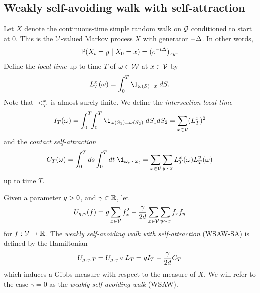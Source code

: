 
\subsection{Weakly self-avoiding walk with self-attraction}

Let $X$ denote the continuous-time simple random walk on $\mathcal{G}$ conditioned
to start at $0$. This is the $\mathcal{V}$-valued Markov process $X$ with generator
$-\Delta$. In other words,
\begin{equation}
\operatorname{\mathbb{P}}(X_t = y \mid X_0 = x) = (e^{-t \Delta})_{xy}.
\end{equation}
Define the \emph{local time} up to time $T$ of $\omega \in \mathcal{W}$ at
$x \in \mathcal{V}$ by
\begin{equation}
\label{e:LTx-def}
\lt^x_T(\omega) = \int_0^T \1_{\omega(S)=x} \; dS.
\end{equation}
Note that $\lt^x_T$ is almost surely finite.
We define the \emph{intersection local time}
\begin{equation}
\label{e:ITdef}
I_T(\omega)
	=
\int_0^T \!\! \int_0^T \1_{\omega(S_1)=\omega(S_2)} \; dS_1 dS_2
	=
\sum_{x\in\vertices} (\lt^x_T)^2
\end{equation}
and the \emph{contact self-attraction}
\begin{equation}
\label{e:CTdef}
C_T(\omega)
	=
\int_0^T ds \int_0^T dt \; \1_{\omega_s \sim \omega_t}
	=
\sum_{x \in \vertices} \sum_{y \sim x} \lt_T^x(\omega) \lt_T^y(\omega)
\end{equation}
up to time $T$.

Given a parameter $g > 0$, and $\gamma \in {\mathbb R}$, let
\begin{equation}
\label{e:Udef-neg}
U_{g,\gamma}(f)
=
g \sum_{x\in\mathcal{V}} f_x^2
- \frac{\gamma}{2d}
\sum_{x\in\mathcal{V}} \sum_{y \sim x} f_x f_y
\end{equation}
for $f : \mathcal{V} \rightarrow {\mathbb R}$.
The \emph{weakly self-avoiding walk with self-attraction} (WSAW-SA) is defined
by the Hamiltonian
\begin{equation}
\label{e:V}
U_{g,\gamma,T}
	= U_{g,\gamma} \circ L_T
	= g I_T - \frac{\gamma}{2 d} C_T
\end{equation}
which induces a Gibbs measure with respect to the measure of $X$.
We will refer to the case $\gamma = 0$ as the \emph{weakly self-avoiding walk} (WSAW).

